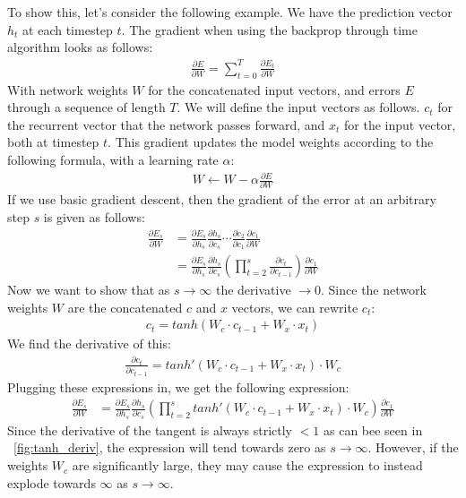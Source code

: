 To show this, let's consider the following example. We have the prediction vector $h_t$ at each timestep $t$. The gradient when using the backprop through time algorithm looks as follows:
\begin{align}
    \frac{\partial E}{\partial W} = \sum_{t=0}^{T} \frac{\partial E_t}{\partial W}
\end{align}
With network weights $W$ for the concatenated input vectors, and errors $E$ through a sequence of length $T$. We will define the input vectors as follows. $c_t$ for the recurrent vector that the network passes forward, and $x_t$ for the input vector, both at timestep $t$.
This gradient updates the model weights according to the following formula, with a learning rate $\alpha$:
\begin{align}
    W \leftarrow W - \alpha \frac{\partial E}{\partial W}
\end{align}
If we use basic gradient descent, then the gradient of the error at an arbitrary step $s$ is given as follows:
\begin{align}
    \frac{\partial E_s}{\partial W} &= \frac{\partial E_s}{\partial h_s}\frac{\partial h_s}{\partial c_s} \cdots \frac{\partial c_2}{\partial c_1} \frac{\partial c_1}{\partial W} \\
    &= \frac{\partial E_s}{\partial h_s}\frac{\partial h_s}{\partial c_s} \left(\prod_{t=2}^s\frac{\partial c_t}{\partial c_{t-1}} \right) \frac{\partial c_1} {\partial W} 
\end{align}
Now we want to show that as $s \rightarrow \infty$ the derivative $\rightarrow 0$. Since the network weights $W$ are the concatenated $c$ and $x$ vectors, we can rewrite $c_t$:
\begin{align}
    c_t = tanh(W_c \cdot c_{t-1} + W_x \cdot x_t)
\end{align}
We find the derivative of this:
\begin{align}
    \frac{\partial c_t}{\partial c_{t-1}} = tanh'(W_c \cdot c_{t-1} + W_x \cdot x_t) \cdot W_c
\end{align}
Plugging these expressions in, we get the following expression:
\begin{align}
    \frac{\partial E_s}{\partial W} &= \frac{\partial E_s}{\partial h_s}\frac{\partial h_s}{\partial c_s} \left(\prod_{t=2}^s tanh'(W_c \cdot c_{t-1} + W_x \cdot x_t) \cdot W_c \right) \frac{\partial c_1}{\partial W}
\end{align}
Since the derivative of the tangent is always strictly $<1$ as can bee seen in ~\ref{fig:tanh_deriv}, the expression will tend towards zero as $s \rightarrow \infty$. However, if the weights $W_c$ are significantly large, they may cause the expression to instead explode towards $\infty$ as $s \rightarrow \infty$.\\
